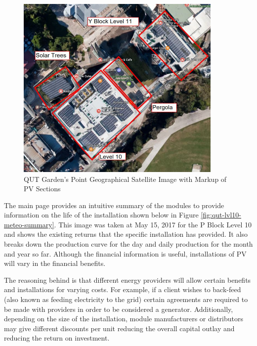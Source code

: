 \begin{figure}[H]
	\hfill\includegraphics[width=100mm]{images/metering/meteo/pblock-map}\hspace*{\fill}
	\caption{QUT Garden's Point Geographical Satellite Image with Markup of PV Sections} 
	\label{fig:qut-map-pv-markup}
\end{figure}



The main page provides an intuitive summary of the modules to provide information on the life of the installation shown below in Figure \ref{fig:qut-lvl10-meteo-summary}. This image was taken at May 15, 2017 for the P Block Level 10 and shows the existing returns that the specific installation has provided. It also breaks down the production curve for the day and daily production for the month and year so far. Although the financial information is useful, installations of PV will vary in the financial benefits. 
\newline

The reasoning behind is that different energy providers will allow certain benefits and installations for varying costs. For example, if a client wishes to back-feed (also known as feeding electricity to the grid) certain agreements are required to be made with providers in order to be considered a generator. Additionally, depending on the size of the installation, module manufacturers or distributors may give different discounts per unit reducing the overall capital outlay and reducing the return on investment.       

